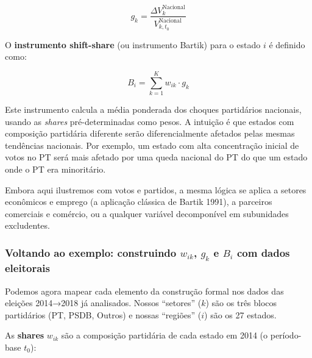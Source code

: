 \documentclass[
]{article}
\begin{document}
\begin{equation}
g_k = \frac{\Delta V_k^{\text{Nacional}}}{V_{k,t_0}^{\text{Nacional}}}
\label{eq:shift-def}
\end{equation}

O \textbf{instrumento shift-share} (ou instrumento Bartik) para o estado \(i\) é definido como:

\begin{equation}
B_i = \sum_{k=1}^{K} w_{ik} \cdot g_k
\label{eq:bartik}
\end{equation}

Este instrumento calcula a média ponderada dos choques partidários nacionais, usando as \emph{shares} pré-determinadas como pesos. A intuição é que estados com composição partidária diferente serão diferencialmente afetados pelas mesmas tendências nacionais. Por exemplo, um estado com alta concentração inicial de votos no PT será mais afetado por uma queda nacional do PT do que um estado onde o PT era minoritário.

Embora aqui ilustremos com votos e partidos, a mesma lógica se aplica a setores econômicos e emprego (a aplicação clássica de Bartik 1991), a parceiros comerciais e comércio, ou a qualquer variável decomponível em subunidades excludentes.

\subsubsection{\texorpdfstring{Voltando ao exemplo: construindo \(w_{ik}\), \(g_k\) e \(B_i\) com dados eleitorais}{Voltando ao exemplo: construindo w\_\{ik\}, g\_k e B\_i com dados eleitorais}}\label{voltando-ao-exemplo-construindo-w_ik-g_k-e-b_i-com-dados-eleitorais}

Podemos agora mapear cada elemento da construção formal nos dados das eleições 2014→2018 já analisados. Nossos ``setores'' (\(k\)) são os três blocos partidários (PT, PSDB, Outros) e nossas ``regiões'' (\(i\)) são os 27 estados.

As \textbf{shares} \(w_{ik}\) são a composição partidária de cada estado em 2014 (o período-base \(t_0\)):
\end{document}
